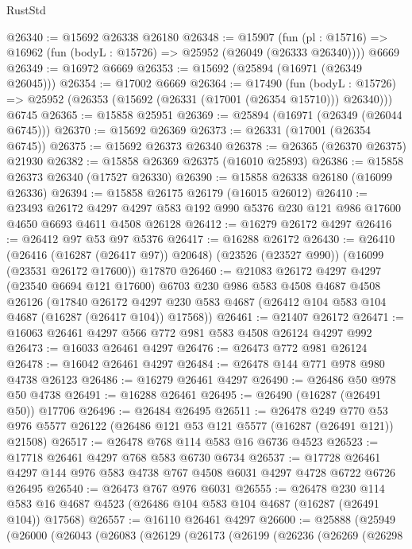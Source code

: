 \begin{lexlean}{RustStd}
\begin{coremodule}
@26340 := @15692 @26338 @26180
@26348 := @15907
    (fun (pl : @15716) => @16962 (fun (bodyL : @15726) => @25952 (@26049 (@26333 @26340))))
    @6669
@26349 := @16972 @6669
@26353 := @15692 (@25894 (@16971 (@26349 @26045)))
@26354 := @17002 @6669
@26364 := @17490
    (fun (bodyL : @15726) => @25952 (@26353 (@15692 (@26331 (@17001 (@26354 @15710))) @26340)))
    @6745
@26365 := @15858 @25951
@26369 := @25894 (@16971 (@26349 (@26044 @6745)))
@26370 := @15692 @26369
@26373 := @26331 (@17001 (@26354 @6745))
@26375 := @15692 @26373 @26340
@26378 := @26365 (@26370 @26375) @21930
@26382 := @15858 @26369 @26375 (@16010 @25893)
@26386 := @15858 @26373 @26340 (@17527 @26330)
@26390 := @15858 @26338 @26180 (@16099 @26336)
@26394 := @15858 @26175 @26179 (@16015 @26012)
@26410 := @23493
    @26172
    @4297
    @4297
    @583
    @192
    @990
    @5376
    @230
    @121
    @986
    @17600
    @4650
    @6693
    @4611
    @4508
    @26128
@26412 := @16279 @26172 @4297
@26416 := @26412 @97 @53 @97 @5376
@26417 := @16288 @26172
@26430 := @26410
    (@26416 (@16287 (@26417 @97)) @20648)
    (@23526 (@23527 @990))
    (@16099 (@23531 @26172 @17600))
    @17870
@26460 := @21083
    @26172
    @4297
    @4297
    (@23540 @6694 @121 @17600)
    @6703
    @230
    @986
    @583
    @4508
    @4687
    @4508
    @26126
    (@17840
      @26172
      @4297
      @230
      @583
      @4687
      (@26412 @104 @583 @104 @4687 (@16287 (@26417 @104)) @17568))
@26461 := @21407 @26172
@26471 := @16063 @26461 @4297 @566 @772 @981 @583 @4508 @26124 @4297 @992
@26473 := @16033 @26461 @4297
@26476 := @26473 @772 @981 @26124
@26478 := @16042 @26461 @4297
@26484 := @26478 @144 @771 @978 @980 @4738 @26123
@26486 := @16279 @26461 @4297
@26490 := @26486 @50 @978 @50 @4738
@26491 := @16288 @26461
@26495 := @26490 (@16287 (@26491 @50)) @17706
@26496 := @26484 @26495
@26511 := @26478
    @249
    @770
    @53
    @976
    @5577
    @26122
    (@26486 @121 @53 @121 @5577 (@16287 (@26491 @121)) @21508)
@26517 := @26478 @768 @114 @583 @16 @6736 @4523
@26523 := @17718 @26461 @4297 @768 @583 @6730 @6734
@26537 := @17728 @26461 @4297 @144 @976 @583 @4738 @767 @4508 @6031 @4297 @4728 @6722 @6726 @26495
@26540 := @26473 @767 @976 @6031
@26555 := @26478
    @230
    @114
    @583
    @16
    @4687
    @4523
    (@26486 @104 @583 @104 @4687 (@16287 (@26491 @104)) @17568)
@26557 := @16110 @26461 @4297
@26600 := @25888
    (@25949
      (@26000
        (@26043
          (@26083
            (@26129
              (@26173
                (@26199
                  (@26236
                    (@26269
                      (@26298

\end{coremodule}
\end{lexlean}
